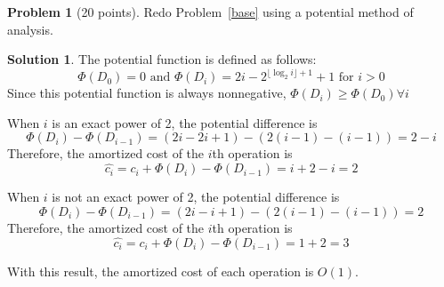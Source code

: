 \documentclass{article}
\theoremstyle{definition}
\newtheorem{problem}{Problem}
\newtheorem*{solution}{Solution}
\begin{document}
\begin{problem}[20 points]
Redo Problem~\ref{base} using a potential method of analysis.
\end{problem}
\begin{solution}
The potential function is defined as follows:
\[\Phi(D_0)=0 \text{ and } \Phi(D_i)=2i-2^{\lfloor\log_2 i\rfloor+1}+1 \text{ for } i>0\]
Since this potential function is always nonnegative, $\Phi(D_i)\geq\Phi(D_0)\forall i$

\noindent
When $i$ is an exact power of 2, the potential difference is
\[\Phi(D_i)-\Phi(D_{i-1})=(2i-2i+1)-(2(i-1)-(i-1))=2-i\]
Therefore, the amortized cost of the $i$th operation is 
\[\hat{c_i}=c_i+\Phi(D_i)-\Phi(D_{i-1})=i+2-i=2\]
\end{solution}

\noindent
When $i$ is not an exact power of 2, the potential difference is
\[\Phi(D_i)-\Phi(D_{i-1})=(2i-i+1)-(2(i-1)-(i-1))=2\]
Therefore, the amortized cost of the $i$th operation is
\[\hat{c_i}=c_i+\Phi(D_i)-\Phi(D_{i-1})=1+2=3\]

\noindent
With this result, the amortized cost of each operation is $O(1)$.
\end{document}
